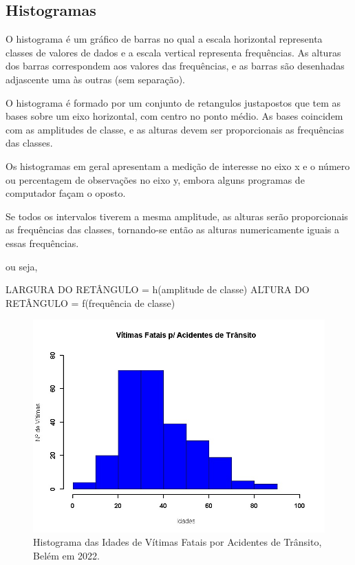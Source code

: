 \newpage
\subsection{Histogramas}

\inic O histograma é um gráfico de barras no qual a escala horizontal representa classes de valores de dados e a escala vertical representa frequências. As alturas dos barras correspondem aos valores das frequências, e as barras são desenhadas adjascente uma às outras (sem separação).
 \vskip0.3cm
 
\inic O histograma é formado por um conjunto de retangulos justapostos
que tem as bases sobre um eixo horizontal, com centro no ponto
médio. As bases coincidem com as amplitudes de classe, e as
alturas devem ser proporcionais as frequências das
classes.
\vskip0.3cm 
 

\inic Os histogramas em geral apresentam a medição de interesse no eixo
x e o número ou percentagem de observações no eixo y, embora
alguns programas de computador façam o oposto. 
\vskip0.3cm

Se todos os intervalos tiverem a mesma amplitude, as alturas serão
proporcionais as frequências das classes, tornando-se então as
alturas numericamente iguais a essas frequências.\vskip0.3cm

ou seja,\vskip0.3cm

LARGURA DO RETÂNGULO = h(amplitude de classe)
ALTURA DO RETÂNGULO = f(frequência de classe)


\begin{figure}
    \centering
\includegraphics[scale=0.40]{figures/histograma1.jpeg}
    \caption{Histograma das Idades de Vítimas Fatais por Acidentes de Trânsito, Belém em 2022.}
    \label{fig:my_label25}
\end{figure}

